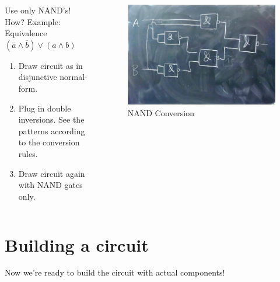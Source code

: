 \documentclass{beamer}
\begin{document}
\begin{frame}
  \begin{columns}
  \begin{column}{5cm}
  Use only NAND's! How?
    \newline Example: Equivalence
  \newline
  $(\overline{a}\land \overline{b})\lor(a\land b)$
  \newline
  \begin{enumerate}
   \item Draw circuit as in disjunctive normal-form.
   \item Plug in double inversions. See the patterns according to the conversion rules.
   \item Draw circuit again with NAND gates only.
  \end{enumerate}

  \end{column}
  
  \begin{column}{6cm}
    \begin{figure}[H]
      \centering
      \includegraphics[width=1\textwidth]{eq3}%
      \caption{NAND Conversion}%
      \label{fig:equivalence_optimized}
    \end{figure}
  \end{column}
  \end{columns}  
\end{frame}

\section{Building a circuit}
\begin{frame}
 Now we're ready to build the circuit with actual components!
 
\end{frame}
\end{document}
